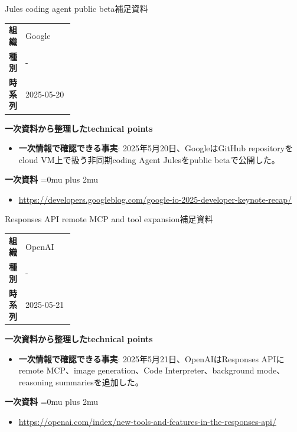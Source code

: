 \begin{technicalnote}{Jules coding agent public beta}{補足資料}
\begingroup
\begin{tabularx}{\linewidth}{@{}>{\bfseries}p{0.22\linewidth}X@{}}
組織 & Google \\
種別 & - \\
時系列 & 2025-05-20 \\
\end{tabularx}
\smallskip
{\bfseries 一次資料から整理したtechnical points}
\begin{itemize}[leftmargin=1.5em,itemsep=0.35em]
\item \textbf{一次情報で確認できる事実}: 2025年5月20日、GoogleはGitHub repositoryをcloud VM上で扱う非同期coding Agent Julesをpublic betaで公開した。
\end{itemize}
\begin{samepage}
{\bfseries 一次資料}
\begingroup\sloppy
\Urlmuskip=0mu plus 2mu\relax
\begin{itemize}[leftmargin=1.5em,itemsep=0.25em]
\item {\scriptsize\url{https://developers.googleblog.com/google-io-2025-developer-keynote-recap/}}
\end{itemize}
\endgroup
\end{samepage}
\endgroup
\end{technicalnote}
\medskip

\begin{technicalnote}{Responses API remote MCP and tool expansion}{補足資料}
\begingroup
\begin{tabularx}{\linewidth}{@{}>{\bfseries}p{0.22\linewidth}X@{}}
組織 & OpenAI \\
種別 & - \\
時系列 & 2025-05-21 \\
\end{tabularx}
\smallskip
{\bfseries 一次資料から整理したtechnical points}
\begin{itemize}[leftmargin=1.5em,itemsep=0.35em]
\item \textbf{一次情報で確認できる事実}: 2025年5月21日、OpenAIはResponses APIにremote MCP、image generation、Code Interpreter、background mode、reasoning summariesを追加した。
\end{itemize}
\begin{samepage}
{\bfseries 一次資料}
\begingroup\sloppy
\Urlmuskip=0mu plus 2mu\relax
\begin{itemize}[leftmargin=1.5em,itemsep=0.25em]
\item {\scriptsize\url{https://openai.com/index/new-tools-and-features-in-the-responses-api/}}
\end{itemize}
\endgroup
\end{samepage}
\endgroup
\end{technicalnote}
\medskip

